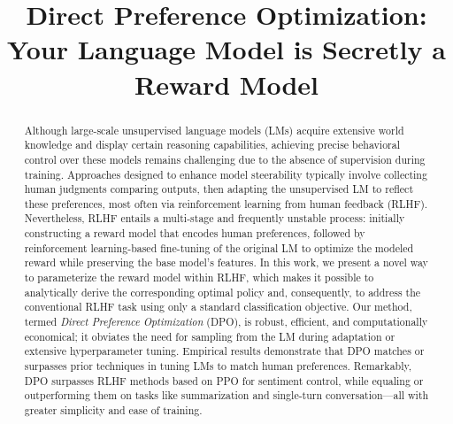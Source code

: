 \title{Direct Preference Optimization: Your Language Model is Secretly a Reward Model}

\begin{abstract}
Although large-scale unsupervised language models (LMs) acquire extensive world knowledge and display certain reasoning capabilities, achieving precise behavioral control over these models remains challenging due to the absence of supervision during training. Approaches designed to enhance model steerability typically involve collecting human judgments comparing outputs, then adapting the unsupervised LM to reflect these preferences, most often via reinforcement learning from human feedback (RLHF). Nevertheless, RLHF entails a multi-stage and frequently unstable process: initially constructing a reward model that encodes human preferences, followed by reinforcement learning-based fine-tuning of the original LM to optimize the modeled reward while preserving the base model's features. In this work, we present a novel way to parameterize the reward model within RLHF, which makes it possible to analytically derive the corresponding optimal policy and, consequently, to address the conventional RLHF task using only a standard classification objective. Our method, termed \textit{Direct Preference Optimization} (DPO), is robust, efficient, and computationally economical; it obviates the need for sampling from the LM during adaptation or extensive hyperparameter tuning. Empirical results demonstrate that DPO matches or surpasses prior techniques in tuning LMs to match human preferences. Remarkably, DPO surpasses RLHF methods based on PPO for sentiment control, while equaling or outperforming them on tasks like summarization and single-turn conversation—all with greater simplicity and ease of training.
\end{abstract}

